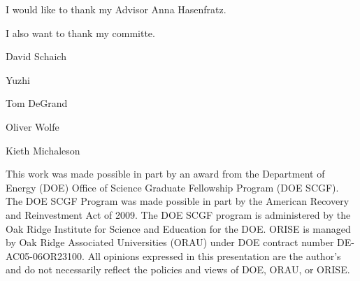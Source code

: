 I would like to thank my Advisor Anna Hasenfratz.  

I also want to thank my committe.

David Schaich

Yuzhi

Tom DeGrand

Oliver Wolfe

Kieth Michaleson


This work was made possible in part by an award from the Department of Energy (DOE) Office of Science Graduate Fellowship Program (DOE SCGF). 
The DOE SCGF Program was made possible in part by the American Recovery and Reinvestment Act of 2009. 
The DOE SCGF program is administered by the Oak Ridge Institute for Science and Education for the DOE. 
ORISE is managed by Oak Ridge Associated Universities (ORAU) under DOE contract number DE- AC05-06OR23100. 
All opinions expressed in this presentation are the author's and do not necessarily reflect the policies and views of DOE, ORAU, or ORISE.
